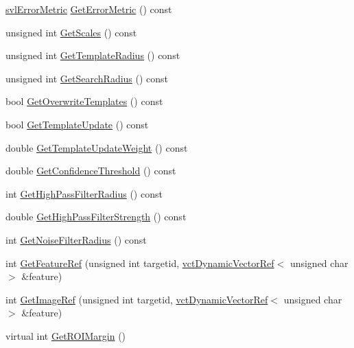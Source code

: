 \begin{DoxyCompactItemize}
\hyperlink{svl_definitions_8h_ade0b97ec3319ac710d7478dd2b608727}{svl\+Error\+Metric} \hyperlink{classsvl_tracker_m_s_brute_force_a05f84e1c56b6e77dc76cd3056a665ee8}{Get\+Error\+Metric} () const 
\item 
unsigned int \hyperlink{classsvl_tracker_m_s_brute_force_a3cd3d398b00a6ab8d6d0a90dcaa465b9}{Get\+Scales} () const 
\item 
unsigned int \hyperlink{classsvl_tracker_m_s_brute_force_ae144e2ee5ab88e36033c692e3a19beb7}{Get\+Template\+Radius} () const 
\item 
unsigned int \hyperlink{classsvl_tracker_m_s_brute_force_a78dc2245729b8d9202613fd6e01513ea}{Get\+Search\+Radius} () const 
\item 
bool \hyperlink{classsvl_tracker_m_s_brute_force_aa740599c31b39776bd4c2ba857439083}{Get\+Overwrite\+Templates} () const 
\item 
bool \hyperlink{classsvl_tracker_m_s_brute_force_aaf206f8acad3a3e4ef2b46dcf8ec7059}{Get\+Template\+Update} () const 
\item 
double \hyperlink{classsvl_tracker_m_s_brute_force_abf556900111a4553a5ae1bd53e7aaa9c}{Get\+Template\+Update\+Weight} () const 
\item 
double \hyperlink{classsvl_tracker_m_s_brute_force_abf7d49bbc65882beded0e10f8012021e}{Get\+Confidence\+Threshold} () const 
\item 
int \hyperlink{classsvl_tracker_m_s_brute_force_a33ca45d65c70cf67ff1ec95e5619c621}{Get\+High\+Pass\+Filter\+Radius} () const 
\item 
double \hyperlink{classsvl_tracker_m_s_brute_force_aec76782c9c8ad66498c6a4f500f29487}{Get\+High\+Pass\+Filter\+Strength} () const 
\item 
int \hyperlink{classsvl_tracker_m_s_brute_force_a7f5ece0f04822b9d4972b3b1cd512279}{Get\+Noise\+Filter\+Radius} () const 
\item 
int \hyperlink{classsvl_tracker_m_s_brute_force_a629b3924d8de4f652def1e2c2bb169e5}{Get\+Feature\+Ref} (unsigned int targetid, \hyperlink{classvct_dynamic_vector_ref}{vct\+Dynamic\+Vector\+Ref}$<$ unsigned char $>$ \&feature)
\item 
int \hyperlink{classsvl_tracker_m_s_brute_force_a71e28e50e7805500aec9410a54949edc}{Get\+Image\+Ref} (unsigned int targetid, \hyperlink{classvct_dynamic_vector_ref}{vct\+Dynamic\+Vector\+Ref}$<$ unsigned char $>$ \&feature)
\item 
virtual int \hyperlink{classsvl_tracker_m_s_brute_force_afea3ca4f31862335eb7802627ec7bf5f}{Get\+R\+O\+I\+Margin} ()
\item 

\end{DoxyCompactItemize}
